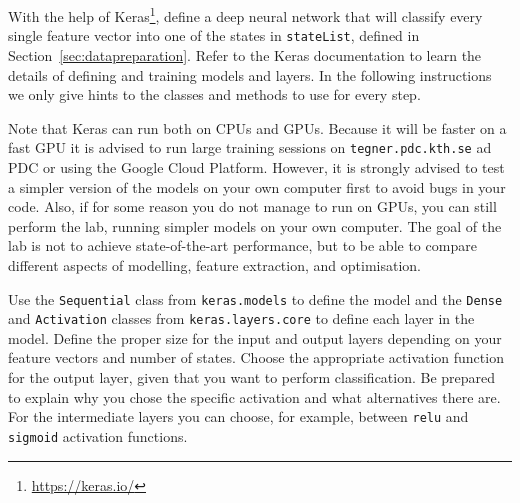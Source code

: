 \documentclass{nada-ten}
\begin{document}
%
With the help of Keras\footnote{\url{https://keras.io/}}, define a deep neural network that will classify every single feature vector into one of the states in \texttt{stateList}, defined in Section~\ref{sec:datapreparation}. Refer to the Keras documentation to learn the details of defining and training models and layers. In the following instructions we only give hints to the classes and methods to use for every step.

\begin{mdframed}
Note that Keras can run both on CPUs and GPUs. Because it will be faster on a fast GPU it is advised to run large training sessions on \texttt{tegner.pdc.kth.se} ad PDC or using the Google Cloud Platform. However, it is strongly advised to test a simpler version of the models on your own computer first to avoid bugs in your code. Also, if for some reason you do not manage to run on GPUs, you can still perform the lab, running simpler models on your own computer. The goal of the lab is not to achieve state-of-the-art performance, but to be able to compare different aspects of modelling, feature extraction, and optimisation.
\end{mdframed}

Use the \texttt{Sequential} class from \texttt{keras.models} to define the model and the \texttt{Dense} and \texttt{Activation} classes from \texttt{keras.layers.core} to define each layer in the model.
Define the proper size for the input and output layers depending on your feature vectors and number of states. Choose the appropriate activation function for the output layer, given that you want to perform classification.
Be prepared to explain why you chose the specific activation and what alternatives there are.
For the intermediate layers you can choose, for example, between \texttt{relu} and \texttt{sigmoid} activation functions.
\end{document}
